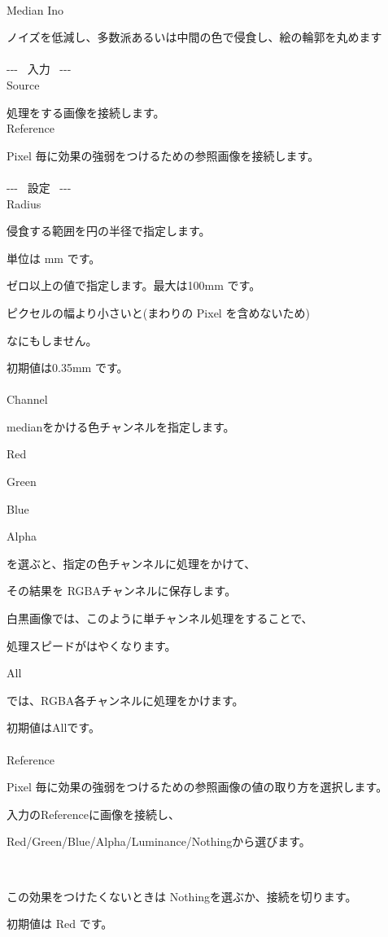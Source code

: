 \documentclass[a4paper,12pt]{article}
\begin{document}
\thispagestyle{empty}

\Large
\noindent \\
Median Ino\medskip
\par
\normalsize
ノイズを低減し、多数派あるいは中間の色で侵食し、絵の輪郭を丸めます\\
\\
-{-}- \ 入力 \ -{-}-\\
Source\par
処理をする画像を接続します。\\
Reference\par
Pixel 毎に効果の強弱をつけるための参照画像を接続します。\\
\\
-{-}- \ 設定 \ -{-}-\\
Radius\par
侵食する範囲を円の半径で指定します。\par
単位は mm です。\\
\par
ゼロ以上の値で指定します。最大は100mm です。\par
ピクセルの幅より小さいと(まわりの Pixel を含めないため)\par
なにもしません。\\
\par
初期値は0.35mm です。\\
\\
Channel\par
medianをかける色チャンネルを指定します。\\
\par
\textquotedbl Red\textquotedbl\par
\textquotedbl Green\textquotedbl\par
\textquotedbl Blue\textquotedbl\par
\textquotedbl Alpha\textquotedbl\par
を選ぶと、指定の色チャンネルに処理をかけて、\par
その結果を RGBAチャンネルに保存します。\par
白黒画像では、このように単チャンネル処理をすることで、\par
処理スピードがはやくなります。\\
\par
\textquotedbl All\textquotedbl\par
では、RGBA各チャンネルに処理をかけます。\\
\par
初期値は\textquotedbl All\textquotedbl です。\\
\\
Reference\par
Pixel 毎に効果の強弱をつけるための参照画像の値の取り方を選択します。\par
入力の\textquotedbl Reference\textquotedbl に画像を接続し、\par
Red/Green/Blue/Alpha/Luminance/Nothingから選びます。

\newpage

\thispagestyle{empty}

\ \vspace{-0.2em}
\par
この効果をつけたくないときは Nothingを選ぶか、接続を切ります。\par
初期値は Red です。
\end{document}
